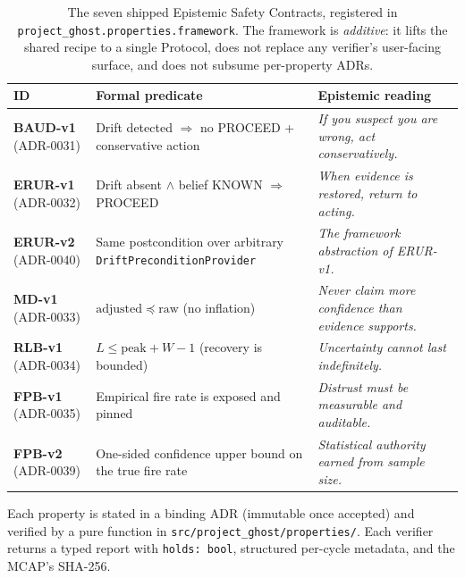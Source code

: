 \documentclass[acmsmall,nonacm=true,review=false]{acmart}
\theoremstyle{plain}
\begin{document}
\begin{table}[h]
\centering\small
\begin{tabularx}{\linewidth}{l X X}
\toprule
\textbf{ID} & \textbf{Formal predicate} & \textbf{Epistemic reading} \\
\midrule
\textbf{BAUD-v1} (ADR-0031) & Drift detected $\Rightarrow$ no PROCEED + conservative action & \emph{If you suspect you are wrong, act conservatively.} \\
\textbf{ERUR-v1} (ADR-0032) & Drift absent $\wedge$ belief KNOWN $\Rightarrow$ PROCEED & \emph{When evidence is restored, return to acting.} \\
\textbf{ERUR-v2} (ADR-0040) & Same postcondition over arbitrary \texttt{DriftPreconditionProvider} & \emph{The framework abstraction of ERUR-v1.} \\
\textbf{MD-v1} (ADR-0033)   & $\mathrm{adjusted} \preceq \mathrm{raw}$ (no inflation) & \emph{Never claim more confidence than evidence supports.} \\
\textbf{RLB-v1} (ADR-0034)  & $L \le \mathrm{peak} + W - 1$ (recovery is bounded) & \emph{Uncertainty cannot last indefinitely.} \\
\textbf{FPB-v1} (ADR-0035)  & Empirical fire rate is exposed and pinned & \emph{Distrust must be measurable and auditable.} \\
\textbf{FPB-v2} (ADR-0039)  & One-sided confidence upper bound on the true fire rate & \emph{Statistical authority earned from sample size.} \\
\bottomrule
\end{tabularx}
\caption{The seven shipped Epistemic Safety Contracts, registered
in \texttt{project\_ghost.properties.framework}. The framework is
\emph{additive}: it lifts the shared recipe to a single Protocol,
does not replace any verifier's user-facing surface, and does not
subsume per-property ADRs.}
\label{tab:epistemic}
\end{table}

Each property is stated in a binding ADR (immutable once
accepted) and verified by a pure function in
\texttt{src/project\_ghost/properties/}. Each verifier returns a
typed report with \texttt{holds: bool}, structured per-cycle
metadata, and the MCAP's SHA-256.
\end{document}

